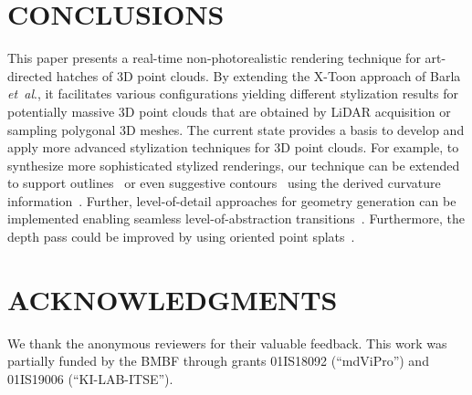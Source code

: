 \documentclass[a4paper,twoside]{article}
\newcommand{\etal}{\textit{et~al}.\xspace}
\begin{document}
\section{\texorpdfstring{\uppercase{Conclusions}}{Conclusions}}%
\label{PCNPR:Sec:Conclusions}
%
This paper presents a real-time non-photorealistic rendering technique for art-directed hatches of 3D point clouds.
By extending the X-Toon approach of Barla \etal, it facilitates various configurations yielding different stylization results for potentially massive 3D point clouds that are obtained by \ac{LiDAR} acquisition or sampling polygonal 3D meshes. 
%
The current state provides a basis to develop and apply more advanced stylization techniques for 3D point clouds.
For example, to synthesize more sophisticated stylized renderings, our technique can be extended to support outlines~\cite{Rosenthal2008} or even suggestive contours~\cite{ProencaJS2008} using the derived curvature information~\cite{Merigot2009,Lu2020}. 
Further, level-of-detail approaches for geometry generation can be implemented enabling seamless 
level-of-abstraction transitions~\cite{SD14}.
Furthermore, the depth pass could be improved by using oriented point splats~\cite{Anjos2018}.




\section*{\uppercase{Acknowledgments}}
%
We thank the anonymous reviewers for their valuable feedback. 
This work was partially funded by the \ac{BMBF} through grants 01IS18092 (\enquote{mdViPro}) and 01IS19006 (\enquote{KI-LAB-ITSE}).




{
\small%

}
\end{document}
